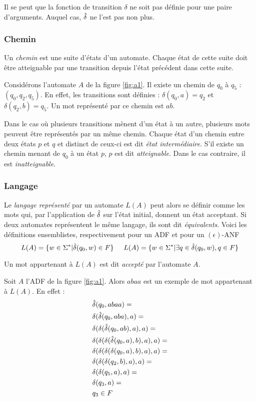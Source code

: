 Il se peut que la fonction de transition $\delta$ ne soit pas définie pour une paire d'arguments. Auquel cas, $\hat{\delta}$ ne l'est pas non plus.\\

\subsubsection*{Chemin}

Un \emph{chemin} est une suite d'états d'un automate. Chaque état de cette suite doit être atteignable par une transition depuis l'état précédent dans cette suite.

\begin{example}[Chemin]
 Considérons l'automate $A$ de la figure \ref{fig:a1}. Il existe un chemin de $q_0$ à $q_5$ : $(q_0,q_2,q_5)$. En effet, les transitions sont définies : $\delta(q_0, a)=q_2$ et $\delta(q_2, b)=q_5$. Un mot représenté par ce chemin est $ab$.
\end{example}

Dans le cas où plusieurs transitions mènent d'un état à un autre, plusieurs mots peuvent être représentés par un même chemin.
Chaque état d'un chemin entre deux états $p$ et $q$ et distinct de ceux-ci est dit \emph{état intermédiaire}. S'il existe un chemin menant de $q_0$ à un état $p$, $p$ est dit \emph{atteignable}. Dans le cas contraire, il est \emph{inatteignable}.

\subsubsection*{Langage}
Le \emph{langage représenté} par un automate \automaton $L(A)$ peut alors se définir comme les mots qui, par l'application de $\hat{\delta}$ sur l'état initial, donnent un état acceptant. Si deux automates représentent le même langage, ils sont dit \emph{équivalents}. Voici les définitions ensemblistes, respectivement pour un ADF et pour un $(\epsilon)$-ANF
$$
L(A)= \{w \in \Sigma^* | \hat{\delta}(q_0,w) \in F\} \hspace{0.5cm}
L(A)= \{w \in \Sigma^* | \exists q \in \hat{\delta}(q_0,w), q \in F\}
$$

Un mot appartenant à $L(A)$ est dit \emph{accepté} par l'automate $A$.


\begin{example}
  Soit $A$ l'ADF de la figure \ref{fig:a1}. Alors $abaa$ est un exemple de mot appartenant à $L(A)$. En effet :
  \begin{align*}
    &\hat{\delta}(q_0,abaa)=\\
    &\delta(\hat{\delta}(q_0,aba),a)=\\
    &\delta(\delta(\hat{\delta}(q_0,ab),a),a)=\\
    &\delta(\delta(\delta(\hat{\delta}(q_0,a),b),a),a)=\\
    &\delta(\delta(\delta(\delta(q_0,a),b),a),a)=\\
    &\delta(\delta(\delta(q_2,b),a),a)=\\
    &\delta(\delta(q_5,a),a)=\\
    &\delta(q_3,a)=\\
    &q_3 \in F
  \end{align*}
\end{example}

